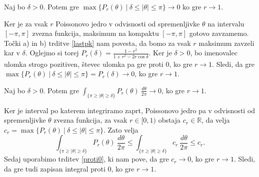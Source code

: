 \documentclass[mat1, tisk]{fmfdelo}
\begin{document}
    \begin{trditev}
        \label{proti0}
        Naj bo $\delta > 0$. Potem gre $\max\{P_r(\theta)~|~ \delta \leq |\theta| \leq \pi\} \to 0$ ko gre $r \to 1$.
    \end{trditev}
    \begin{dokaz}
        Ker je za vsak $r$ Poissonovo jedro v odvisnosti od spremenljivke $\theta$ na intervalu $[-\pi, \pi]$ zvezna funkcija, maksimum na kompaktu $[-\pi, \pi]$ gotovo zavzamemo. Točki a) in b) trditve \ref{lastpk} nam povesta, da bomo za vsak $r$ maksimum zavzeli kar v $\delta$. 
        Oglejmo si torej $P_r(\delta) = \frac{1 -r^2}{1 + r^2 - 2r \cos\delta}$. Ker je $\delta >0 $, bo imenovalec ulomka strogo pozitiven, števec ulomka pa gre proti $0$, ko gre $r \to 1$. 
        Sledi, da gre \mbox{$\max\{P_r(\theta)~|~ \delta \leq |\theta| \leq \pi\} = P_r(\delta) \to 0$}, ko gre $r \to 1$.
    \end{dokaz}
    \begin{posledica}
        \label{int_proti0}
        Naj bo $\delta > 0$. Potem gre ${\int_{\{\pi \geq |\theta| \geq \delta\}}{P_{r}(\theta)~\frac{d\theta}{2 \pi}}} \to 0$, ko gre $r \to 1$.
    \end{posledica}
    \begin{dokaz}
        Ker je interval po katerem integriramo zaprt, Poissonovo jedro pa v odvisnosti od spremenljivke $\theta$ zvezna funkcija, za vsak $r \in [0,1)$ obstaja $c_r \in \mathbb{R}$, da velja $c_r = \max\{P_r(\theta)~|~ \delta \leq |\theta| \leq \pi\}$. Zato velja
        $$
        {\int_{\{\pi \geq |\theta| \geq \delta\}}{P_{r}(\theta)~\frac{d\theta}{2 \pi}}} \leq {\int_{\{\pi \geq |\theta| \geq \delta\}}{c_r~\frac{d\theta}{2 \pi}}} \leq c_r.
        $$
        Sedaj uporabimo trditev \ref{proti0}, ki nam pove, da gre $c_r \to 0$, ko gre $r \to 1$. Sledi, da gre tudi zapisan integral proti $0$, ko gre $r \to 1$.
    \end{dokaz}
\end{document}
